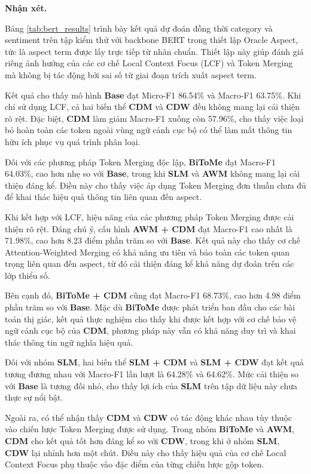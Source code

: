 \textbf{Nhận xét.}

Bảng \ref{tab:bert_results} trình bày kết quả dự đoán đồng thời category và sentiment trên tập kiểm thử với backbone BERT trong thiết lập Oracle Aspect, tức là aspect term được lấy trực tiếp từ nhãn chuẩn. Thiết lập này giúp đánh giá riêng ảnh hưởng của các cơ chế Local Context Focus (LCF) và Token Merging mà không bị tác động bởi sai số từ giai đoạn trích xuất aspect term.

Kết quả cho thấy mô hình \textbf{Base} đạt Micro-F1 86.54\% và Macro-F1 63.75\%. Khi chỉ sử dụng LCF, cả hai biến thể \textbf{CDM} và \textbf{CDW} đều không mang lại cải thiện rõ rệt. Đặc biệt, \textbf{CDM} làm giảm Macro-F1 xuống còn 57.96\%, cho thấy việc loại bỏ hoàn toàn các token ngoài vùng ngữ cảnh cục bộ có thể làm mất thông tin hữu ích phục vụ quá trình phân loại.

Đối với các phương pháp Token Merging độc lập, \textbf{BiToMe} đạt Macro-F1 64.03\%, cao hơn nhẹ so với \textbf{Base}, trong khi \textbf{SLM} và \textbf{AWM} không mang lại cải thiện đáng kể. Điều này cho thấy việc áp dụng Token Merging đơn thuần chưa đủ để khai thác hiệu quả thông tin liên quan đến aspect.

Khi kết hợp với LCF, hiệu năng của các phương pháp Token Merging được cải thiện rõ rệt. Đáng chú ý, cấu hình \textbf{AWM + CDM} đạt Macro-F1 cao nhất là 71.98\%, cao hơn 8.23 điểm phần trăm so với \textbf{Base}. Kết quả này cho thấy cơ chế Attention-Weighted Merging có khả năng ưu tiên và bảo toàn các token quan trọng liên quan đến aspect, từ đó cải thiện đáng kể khả năng dự đoán trên các lớp thiểu số.

Bên cạnh đó, \textbf{BiToMe + CDM} cũng đạt Macro-F1 68.73\%, cao hơn 4.98 điểm phần trăm so với \textbf{Base}. Mặc dù \textbf{BiToMe} được phát triển ban đầu cho các bài toán thị giác, kết quả thực nghiệm cho thấy khi được kết hợp với cơ chế bảo vệ ngữ cảnh cục bộ của \textbf{CDM}, phương pháp này vẫn có khả năng duy trì và khai thác thông tin ngữ nghĩa hiệu quả.

Đối với nhóm \textbf{SLM}, hai biến thể \textbf{SLM + CDM} và \textbf{SLM + CDW} đạt kết quả tương đương nhau với Macro-F1 lần lượt là 64.28\% và 64.62\%. Mức cải thiện so với \textbf{Base} là tương đối nhỏ, cho thấy lợi ích của \textbf{SLM} trên tập dữ liệu này chưa thực sự nổi bật.

Ngoài ra, có thể nhận thấy \textbf{CDM} và \textbf{CDW} có tác động khác nhau tùy thuộc vào chiến lược Token Merging được sử dụng. Trong nhóm \textbf{BiToMe} và \textbf{AWM}, \textbf{CDM} cho kết quả tốt hơn đáng kể so với \textbf{CDW}, trong khi ở nhóm \textbf{SLM}, \textbf{CDW} lại nhỉnh hơn một chút. Điều này cho thấy hiệu quả của cơ chế Local Context Focus phụ thuộc vào đặc điểm của từng chiến lược gộp token.

